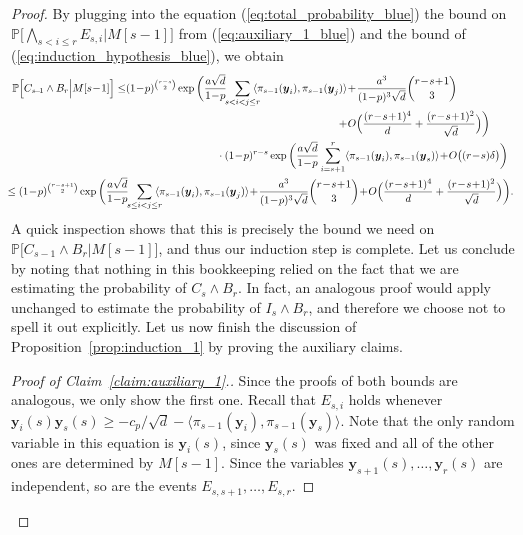\documentclass[11pt]{amsart}
\theoremstyle{definition}
\def\Pb{\mathbb{P}}
\def\by{\boldsymbol{y}}
\begin{document}
\begin{proof}
By plugging into the equation (\ref{eq:total_probability_blue}) the bound on $\Pb\Big[\bigwedge_{s<i\leq r}E_{s, i}\Big|M[s-1]\Big]$ from (\ref{eq:auxiliary_1_blue}) and the bound of (\ref{eq:induction_hypothesis_blue}), we obtain
{\smaller[0.3]
\begin{align*}
\Pb\Big[C_{s\!-\!1}\wedge B_r\Big| M[s\!-\!1]\Big]\leq    &(1\!-\!p)^{\binom{r-s}{2}}\exp\bigg(\frac{a\sqrt{d}}{1\!-\!p}\!\!\sum_{s<i< j\leq r}\!\!\!\!\langle \pi_{s-1}(\by_i), \pi_{s-1}(\by_j)\rangle\!+\!\frac{a^3}{(1\!-\!p)^3\sqrt{d}}\binom{r\!-\!s\!+\!1}{3}\\
&\hspace{7cm}\!+\!O\Big(\frac{(r\!-\!s\!+\!1)^4}{d}+\frac{(r\!-\!s\!+\!1)^2}{\sqrt{d}}\Big)\bigg)\\
&\hspace{3cm}\cdot(1\!-\!p)^{r-s}\exp\bigg(\frac{a\sqrt{d}}{1\!-\!p}\sum_{i=s+1}^r \langle \pi_{s-1}(\by_i), \pi_{s-1}(\by_s)\rangle\!+\!O\big((r\!-\!s)\delta\big)\bigg)\\
&\hspace{-4cm}\leq (1\!-\!p)^{\binom{r-s+1}{2}}\exp\bigg(\frac{a\sqrt{d}}{1\!-\!p}\!\!\sum_{s\leq i< j\leq r}\!\!\!\!\langle \pi_{s-1}(\by_i), \pi_{s-1}(\by_j)\rangle\!+\!\frac{a^3}{(1\!-\!p)^3\sqrt{d}}\binom{r\!-\!s\!+\!1}{3}\!+\!O\Big(\frac{(r\!-\!s\!+\!1)^4}{d}+\frac{(r\!-\!s\!+\!1)^2}{\sqrt{d}}\Big)\bigg).
\end{align*}
}
A quick inspection shows that this is precisely the bound we need on $\Pb\big[C_{s-1}\wedge B_r\big|M[s-1]\big]$, and thus our induction step is complete. Let us conclude by noting that nothing in this bookkeeping relied on the fact that we are estimating the probability of $C_s\wedge B_r$. In fact, an analogous proof would apply unchanged to estimate the probability of $I_s\wedge B_r$, and therefore we choose not to spell it out explicitly. Let us now finish the discussion of Proposition~\ref{prop:induction_1} by proving the auxiliary claims.

\begin{proof}[Proof of Claim~\ref{claim:auxiliary_1}.]
Since the proofs of both bounds are analogous, we only show the first one. Recall that $E_{s, i}$ holds whenever $\by_i(s)\by_s(s)\geq -c_p/\sqrt{d}-\langle \pi_{s-1}(\by_i), \pi_{s-1}(\by_s)\rangle$. Note that the only random variable in this equation is $\by_i(s)$, since $\by_s(s)$ was fixed and all of the other ones are determined by $M[s-1]$. Since the variables $\by_{s+1}(s), \dots, \by_{r}(s)$ are independent, so are the events $E_{s, s+1}, \dots, E_{s, r}$.


\end{proof}
\end{proof}
\end{document}
